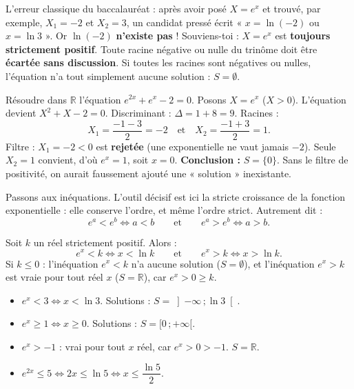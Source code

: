 \documentclass[11pt]{article}
\newcommand{\cle}[1]{{\popxbold\color{popdark}#1}}
\newcounter{popsec}
\newcounter{popsub}
\newcommand{\courssub}[1]{%
  \stepcounter{popsub}%
  \par\vspace{9pt}\noindent{\popxbold\fontsize{11.5}{13}\selectfont\color{popink}{\color{poporange}\thepopsec.\thepopsub}\hspace{6pt}#1}\par\nopagebreak\vspace{4pt}
}
\begin{document}
\begin{attention}
L'erreur classique du baccalauréat : après avoir posé $X = e^x$ et trouvé, par exemple, $X_1 = -2$ et $X_2 = 3$, un candidat pressé écrit « $x = \ln(-2)$ ou $x = \ln 3$ ». Or $\ln(-2)$ \textbf{n'existe pas} ! Souviens-toi : $X = e^x$ est \textbf{toujours strictement positif}. Toute racine négative ou nulle du trinôme doit être \textbf{écartée sans discussion}. Si toutes les racines sont négatives ou nulles, l'équation n'a tout simplement aucune solution : $S = \emptyset$.
\end{attention}

\begin{exoresolu}
Résoudre dans $\mathbb{R}$ l'équation $e^{2x} + e^x - 2 = 0$.
\tcblower
Posons $X = e^x$ ($X > 0$). L'équation devient $X^2 + X - 2 = 0$. Discriminant : $\Delta = 1 + 8 = 9$. Racines :
\[ X_1 = \frac{-1 - 3}{2} = -2 \quad \text{et} \quad X_2 = \frac{-1 + 3}{2} = 1. \]
Filtre : $X_1 = -2 < 0$ est \textbf{rejetée} (une exponentielle ne vaut jamais $-2$). Seule $X_2 = 1$ convient, d'où $e^x = 1$, soit $x = 0$.
\textbf{Conclusion :} $S = \{0\}$. Sans le filtre de positivité, on aurait faussement ajouté une « solution » inexistante.
\end{exoresolu}

\courssub{Inéquations d'inconnue $e^x$}

Passons aux inéquations. L'outil décisif est ici la \cle{stricte croissance} de la fonction exponentielle : elle conserve l'ordre, et même l'ordre strict. Autrement dit :
\[ e^a < e^b \Leftrightarrow a < b \qquad \text{et} \qquad e^a > e^b \Leftrightarrow a > b. \]

\begin{propriete}
Soit $k$ un réel strictement positif. Alors :
\[ e^x < k \Leftrightarrow x < \ln k \qquad \text{et} \qquad e^x > k \Leftrightarrow x > \ln k. \]
Si $k \leq 0$ : l'inéquation $e^x < k$ n'a aucune solution ($S = \emptyset$), et l'inéquation $e^x > k$ est vraie pour tout réel $x$ ($S = \mathbb{R}$), car $e^x > 0 \geq k$.
\end{propriete}

\begin{exemplebox}
\begin{itemize}
\item $e^x < 3 \Leftrightarrow x < \ln 3$. Solutions : $S = \left]-\infty \,; \ln 3\right[$.
\item $e^x \geq 1 \Leftrightarrow x \geq 0$. Solutions : $S = [0\,; +\infty[$.
\item $e^x > -1$ : vrai pour tout $x$ réel, car $e^x > 0 > -1$. $S = \mathbb{R}$.
\item $e^{2x} \leq 5 \Leftrightarrow 2x \leq \ln 5 \Leftrightarrow x \leq \dfrac{\ln 5}{2}$.
\end{itemize}
\end{exemplebox}
\end{document}

